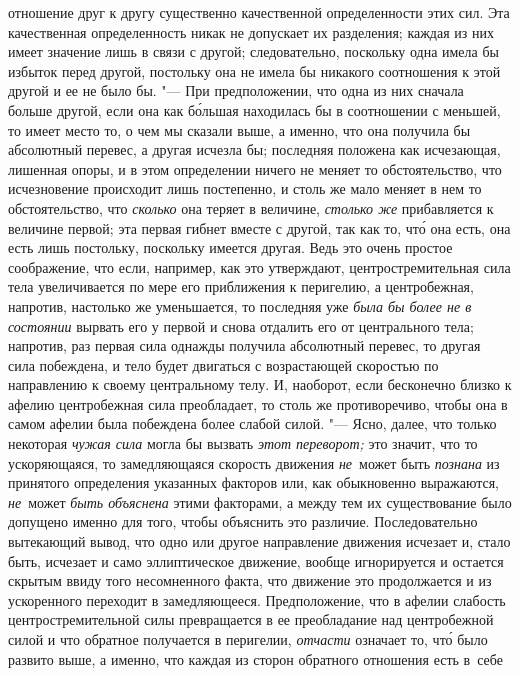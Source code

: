 отношение друг к другу существенно качественной определенности этих сил. Эта
качественная определенность никак не допускает их разделения; каждая из них
имеет значение лишь в связи с другой; следовательно, поскольку одна имела бы
избыток перед другой, постольку она не имела бы никакого соотношения к этой
другой и ее не было бы. "--- При предположении, что одна из них сначала больше
другой, если она как б\'{о}льшая находилась бы в соотношении с меньшей, то
имеет место то, о чем мы сказали выше, а именно, что она получила бы абсолютный
перевес, а другая исчезла бы; последняя положена как исчезающая, лишенная
опоры, и в этом определении ничего не меняет то обстоятельство, что
исчезновение происходит лишь постепенно, и столь же мало меняет в нем то
обстоятельство, что {\em сколько} она теряет в величине, {\em столько же}
прибавляется к величине первой; эта первая гибнет вместе с другой, так как то,
чт\'{о} она есть, она есть лишь постольку, поскольку имеется другая. Ведь это
очень простое соображение, что если, например, как это утверждают,
центростремительная сила тела увеличивается по мере его приближения к
перигелию, а центробежная, напротив, настолько же уменьшается, то последняя уже
{\em была бы более не в состоянии} вырвать его у первой и снова отдалить его от
центрального тела; напротив, раз первая сила однажды получила абсолютный
перевес, то другая сила побеждена, и тело будет двигаться с возрастающей
скоростью по направлению к своему центральному телу. И, наоборот, если
бесконечно близко к афелию центробежная сила преобладает, то столь же
противоречиво, чтобы она в самом афелии была побеждена более слабой силой. "---
Ясно, далее, что только некоторая {\em чужая сила} могла бы вызвать
{\em этот переворот;} это значит, что то ускоряющаяся, то замедляющаяся
скорость движения {\em не}~может быть {\em познана} из принятого определения
указанных факторов или, как обыкновенно выражаются, {\em не}~может
{\em быть объяснена} этими факторами, а между тем их существование было
допущено именно для того, чтобы объяснить это различие. Последовательно
вытекающий вывод, что одно или другое направление движения исчезает и, стало
быть, исчезает и само эллиптическое движение, вообще игнорируется и остается
скрытым ввиду того несомненного факта, что движение это продолжается и из
ускоренного переходит в замедляющееся. Предположение, что в афелии слабость
центростремительной силы превращается в ее преобладание над центробежной силой
и что обратное получается в перигелии, {\em отчасти} означает то, чт\'{о} было
развито выше, а именно, что каждая из сторон обратного отношения есть в~себе
